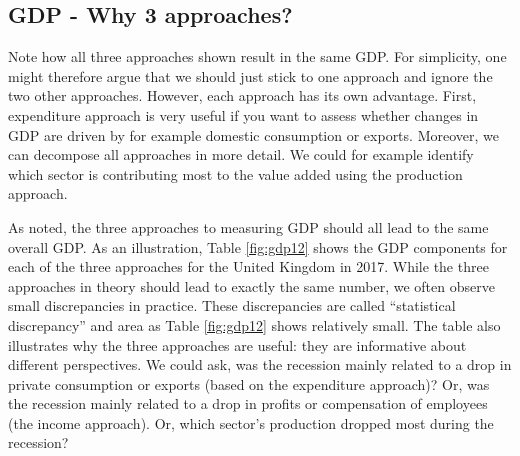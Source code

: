 \documentclass[]{book}
\begin{document}
\hypertarget{gdp---why-3-approaches}{%
\subsection{GDP - Why 3 approaches?}\label{gdp---why-3-approaches}}

Note how all three approaches shown result in the same GDP. For simplicity, one might therefore argue that we should just stick to one approach and ignore the two other approaches. However, each approach has its own advantage. First, expenditure approach is very useful if you want to assess whether changes in GDP are driven by for example domestic consumption or exports. Moreover, we can decompose all approaches in more detail. We could for example identify which sector is contributing most to the value added using the production approach.

As noted, the three approaches to measuring GDP should all lead to the same overall GDP. As an illustration, Table \ref{fig:gdp12} shows the GDP components for each of the three approaches for the United Kingdom in 2017. While the three approaches in theory should lead to exactly the same number, we often observe small discrepancies in practice. These discrepancies are called ``statistical discrepancy'' and area as Table \ref{fig:gdp12} shows relatively small. The table also illustrates why the three approaches are useful: they are informative about different perspectives. We could ask, was the recession mainly related to a drop in private consumption or exports (based on the expenditure approach)? Or, was the recession mainly related to a drop in profits or compensation of employees (the income approach). Or, which sector's production dropped most during the recession?
\end{document}
